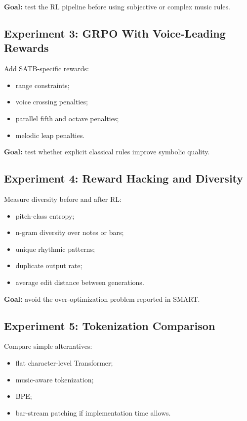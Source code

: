 \documentclass[11pt]{article}
\begin{document}
\textbf{Goal:} test the RL pipeline before using subjective or complex music
rules.

\subsection{Experiment 3: GRPO With Voice-Leading Rewards}

Add SATB-specific rewards:

\begin{itemize}[leftmargin=*]
  \item range constraints;
  \item voice crossing penalties;
  \item parallel fifth and octave penalties;
  \item melodic leap penalties.
\end{itemize}

\textbf{Goal:} test whether explicit classical rules improve symbolic quality.

\subsection{Experiment 4: Reward Hacking and Diversity}

Measure diversity before and after RL:

\begin{itemize}[leftmargin=*]
  \item pitch-class entropy;
  \item n-gram diversity over notes or bars;
  \item unique rhythmic patterns;
  \item duplicate output rate;
  \item average edit distance between generations.
\end{itemize}

\textbf{Goal:} avoid the over-optimization problem reported in SMART.

\subsection{Experiment 5: Tokenization Comparison}

Compare simple alternatives:

\begin{itemize}[leftmargin=*]
  \item flat character-level Transformer;
  \item music-aware tokenization;
  \item BPE;
  \item bar-stream patching if implementation time allows.
\end{itemize}
\end{document}
